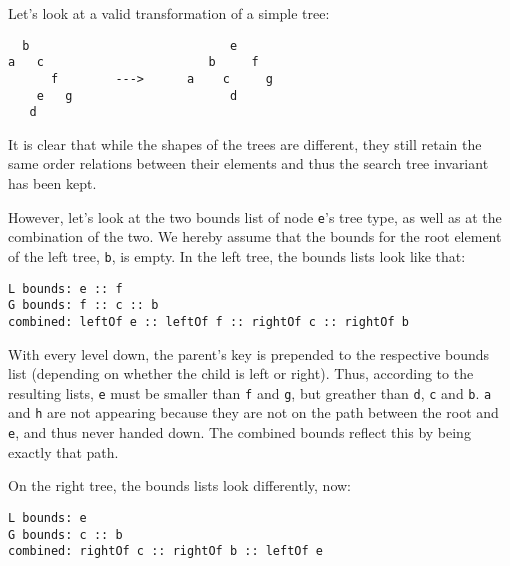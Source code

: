 \documentclass{scrartcl}
\begin{document}
Let's look at a valid transformation of a simple tree:

\begin{verbatim}
  b                            e
a   c                       b     f
      f        --->      a    c     g
    e   g                      d
   d

\end{verbatim}

It is clear that while the shapes of the trees are different, they
still retain the same order relations between their elements and thus
the search tree invariant has been kept.

However, let's look at the two bounds list of node \verb/e/'s tree
type, as well as at the combination of the two. We hereby assume that
the bounds for the root element of the left tree, \verb/b/, is
empty. In the left tree, the bounds lists look like that:

\begin{verbatim}
L bounds: e :: f
G bounds: f :: c :: b
combined: leftOf e :: leftOf f :: rightOf c :: rightOf b
\end{verbatim}

With every level down, the parent's key is prepended to the respective
bounds list (depending on whether the child is left or right). Thus,
according to the resulting lists, \verb/e/ must be smaller than
\verb/f/ and \verb/g/, but greather than \verb/d/, \verb/c/ and
\verb/b/. \verb/a/ and \verb/h/ are not appearing because they are not
on the path between the root and \verb/e/, and thus never handed
down. The combined bounds reflect this by being exactly that path.

On the right tree, the bounds lists look differently, now:

\begin{verbatim}
L bounds: e
G bounds: c :: b
combined: rightOf c :: rightOf b :: leftOf e
\end{verbatim}



\end{document}
